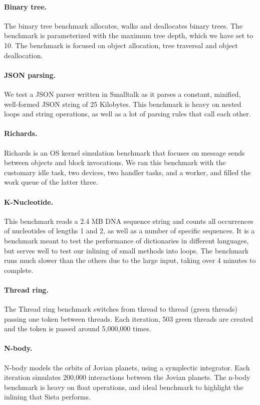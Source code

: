 \documentclass[a4paper,12pt,twoside]{../includes/ThesisStyle}
\begin{document}
	\paragraph{Binary tree.}The binary tree benchmark allocates, walks and deallocates binary trees. The benchmark is parameterized with the maximum tree depth, which we have set to 10. The benchmark is focused on object allocation, tree traversal and object deallocation.

	\paragraph{JSON parsing.}We test a JSON parser written in Smalltalk as it parses a constant, minified, well-formed JSON string of 25 Kilobytes. This benchmark is heavy on nested loops and string operations, as well as a lot of parsing rules that call each other.

	\paragraph{Richards.}Richards is an OS kernel simulation benchmark that focuses on message sends between objects and block invocations. We ran this benchmark with the customary idle task, two devices, two handler tasks, and a worker, and filled the work queue of the latter three.

	\paragraph{K-Nucleotide.}This benchmark reads a 2.4 MB DNA sequence string and counts all occurrences of nucleotides of lengths 1 and 2, as well as a number of specific sequences. It is a benchmark meant to test the performance of dictionaries in different languages, but serves well to test our inlining of small methods into loops. The benchmark runs much slower than the others due to the large input, taking over 4 minutes to complete.

	\paragraph{Thread ring.}The Thread ring benchmark switches from thread to thread (green threads) passing one token between threads. Each iteration, 503 green threads are created and the token is passed around 5,000,000 times.

	\paragraph{N-body.}N-body models the orbits of Jovian planets, using a symplectic integrator. Each iteration simulates 200,000 interactions between the Jovian planets. The n-body benchmark is heavy on float operations, and ideal benchmark to highlight the inlining that Sista performs.
\end{document}
